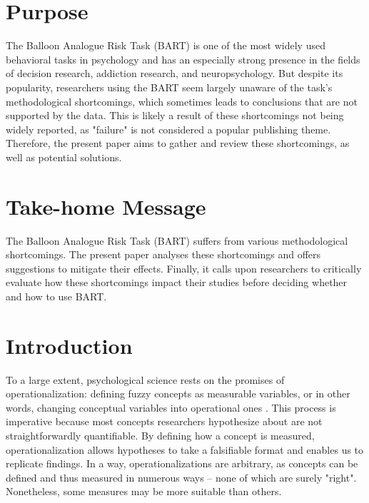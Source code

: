 \documentclass[serif, twocolumn, authordate, meta]{jote-article}
\begin{document}
{}
\section*{Purpose}
The Balloon Analogue Risk Task (BART) is one of the most widely used behavioral tasks in psychology and has an especially strong presence in the fields of decision research, addiction research, and neuropsychology. But despite its popularity, researchers using the BART seem largely unaware of the task's methodological shortcomings, which sometimes leads to conclusions that are not supported by the data. This is likely a result of these shortcomings not being widely reported, as "failure" is not considered a popular publishing theme. Therefore, the present paper aims to gather and review these shortcomings, as well as potential solutions.

{}
\section*{Take-home Message}
The Balloon Analogue Risk Task (BART) suffers from various methodological shortcomings. The present paper analyses these shortcomings and offers suggestions to mitigate their effects. Finally, it calls upon researchers to critically evaluate how these shortcomings impact their studies before deciding whether and how to use BART.

{}
\section*{Introduction}

To a large extent, psychological science rests on the promises of operationalization: defining fuzzy concepts as measurable variables, or in other words, changing conceptual variables into operational ones \parencite{Shuttleworth2008}. This process is imperative because most concepts researchers hypothesize about are not straightforwardly quantifiable. By defining how a concept is measured, operationalization allows hypotheses to take a falsifiable format and enables us to replicate findings. In a way, operationalizations are arbitrary, as concepts can be defined and thus measured in numerous ways -- none of which are surely "right".
Nonetheless, some measures may be more suitable than others.
\end{document}
